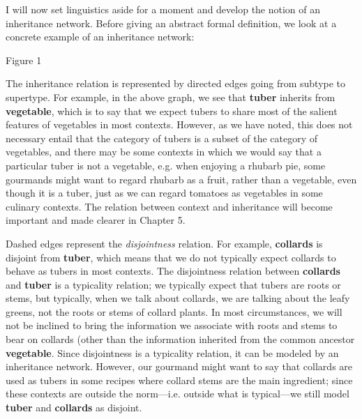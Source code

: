 I will now set linguistics aside for a moment and develop the notion of an inheritance network. Before giving an abstract formal definition, we look at a concrete example of an inheritance network:
\par\vspace{5mm}
\centerline{
}
\centerline{Figure 1}
\par\vspace{5mm}
The inheritance relation is represented by directed edges going from subtype to supertype. For example, in the above graph, we see that {\bf tuber} inherits from {\bf vegetable}, which is to say that we expect tubers to share most of the salient features of vegetables in most contexts. However, as we have noted, this does not necessary entail that the category of tubers is a subset of the category of vegetables,  and there may be some contexts in which we would say that a particular tuber is not a vegetable, e.g. when enjoying a rhubarb pie, some gourmands might want to regard rhubarb as a fruit, rather than a vegetable, even though it is a tuber, just as we can regard tomatoes as vegetables in some culinary contexts. The relation between context and inheritance will become important and made clearer in Chapter 5.

Dashed edges represent the \emph{disjointness} relation. For example, {\bf collards} is disjoint from {\bf tuber}, which means that we do not typically expect collards to behave as tubers in most contexts. The disjointness relation between {\bf collards} and {\bf tuber} is a typicality relation; we typically expect that tubers are roots or stems, but typically, when we talk about collards, we are talking about the leafy greens, not the roots or stems of collard plants. In most circumstances, we will not be inclined to bring the information we associate with roots and stems to bear on collards (other than the information inherited from the common ancestor {\bf vegetable}. Since disjointness is a typicality relation, it can be modeled by an inheritance network. However, our gourmand might want to say that collards are used as tubers in some recipes where collard stems are the main ingredient; since these contexts are outside the norm---i.e. outside what is typical---we still model {\bf tuber} and {\bf collards} as disjoint.

